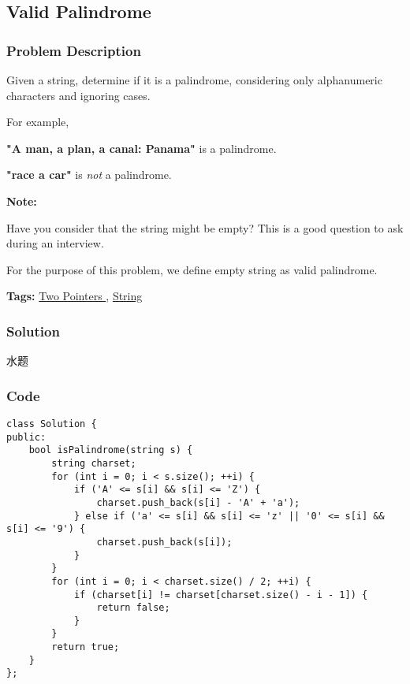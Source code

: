 \documentclass{article}
\begin{document}
\begin{CJK*}{UTF8}{gkai}
\begin{lstlisting}
\end{lstlisting}


\subsection{ Valid Palindrome }
\label{ Valid Palindrome }

\subsubsection*{Problem Description}
Given a string, determine if it is a palindrome, considering only alphanumeric characters and ignoring cases.

For example,


\textbf{"A man, a plan, a canal: Panama"} is a palindrome.


\textbf{"race a car"} is \emph{not} a palindrome.

\textbf{Note:}


Have you consider that the string might be empty? This is a good question to ask during an interview.

For the purpose of this problem, we define empty string as valid palindrome.


\textbf{Tags: }
\hyperref[ Two Pointers ]{ Two Pointers },  \hyperref[ String ]{ String }



\subsubsection*{Solution}
水题

\subsubsection*{Code}
\begin{lstlisting}
class Solution {
public:
    bool isPalindrome(string s) {
        string charset;
        for (int i = 0; i < s.size(); ++i) {
            if ('A' <= s[i] && s[i] <= 'Z') {
                charset.push_back(s[i] - 'A' + 'a');
            } else if ('a' <= s[i] && s[i] <= 'z' || '0' <= s[i] && s[i] <= '9') {
                charset.push_back(s[i]);
            }
        }
        for (int i = 0; i < charset.size() / 2; ++i) {
            if (charset[i] != charset[charset.size() - i - 1]) {
                return false;
            }
        }
        return true;
    }
}; 
\end{lstlisting}



\end{CJK*}
\end{document}

